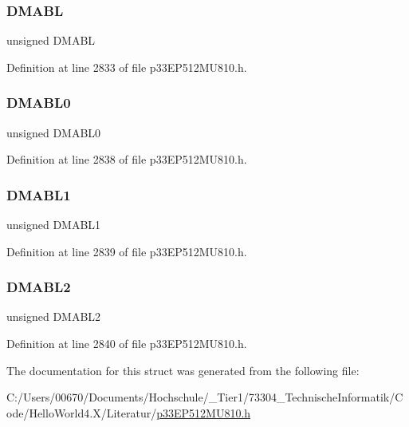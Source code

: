 \subsubsection{\texorpdfstring{D\+M\+A\+BL}{DMABL}}
{\footnotesize\ttfamily unsigned D\+M\+A\+BL}



Definition at line 2833 of file p33\+E\+P512\+M\+U810.\+h.

\mbox{\label{structtag_a_d2_c_o_n4_b_i_t_s_acda72d244c5eeafabf18f267851b89a1}} 
\subsubsection{\texorpdfstring{D\+M\+A\+B\+L0}{DMABL0}}
{\footnotesize\ttfamily unsigned D\+M\+A\+B\+L0}



Definition at line 2838 of file p33\+E\+P512\+M\+U810.\+h.

\mbox{\label{structtag_a_d2_c_o_n4_b_i_t_s_ae313e43c24c80a35a2ec07db385edf09}} 
\subsubsection{\texorpdfstring{D\+M\+A\+B\+L1}{DMABL1}}
{\footnotesize\ttfamily unsigned D\+M\+A\+B\+L1}



Definition at line 2839 of file p33\+E\+P512\+M\+U810.\+h.

\mbox{\label{structtag_a_d2_c_o_n4_b_i_t_s_ab3ae1ef64c4b8d25608d31a00b64f93d}} 
\subsubsection{\texorpdfstring{D\+M\+A\+B\+L2}{DMABL2}}
{\footnotesize\ttfamily unsigned D\+M\+A\+B\+L2}



Definition at line 2840 of file p33\+E\+P512\+M\+U810.\+h.



The documentation for this struct was generated from the following file\+:\begin{DoxyCompactItemize}
\item 
C\+:/\+Users/00670/\+Documents/\+Hochschule/\+\_\+\+Tier1/73304\+\_\+\+Technische\+Informatik/\+Code/\+Hello\+World4.\+X/\+Literatur/\hyperlink{p33_e_p512_m_u810_8h}{p33\+E\+P512\+M\+U810.\+h}\end{DoxyCompactItemize}
